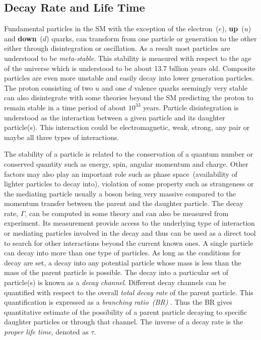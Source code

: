 \subsection{Decay Rate and Life Time}
Fundamental particles in the SM with the exception of the electron~($e$), \textbf{up}~($u$) and \textbf{down}~($d$) quarks, can transform from one particle or generation to the other either through disintegration or oscillation. As a result most particles are understood to be \textit{meta-stable}. This stability is measured with respect to the age of the universe which is understood to be about 13.7 billion years old. Composite particles are even more unstable and easily decay into lower generation particles. The proton consisting of two $u$ and one $d$ valence quarks seemingly very stable can also disintegrate with some theories beyond the SM predicting the proton to remain stable in a time period of about $10^{33}$ years.
Particle disintegration is understood as the interaction between a given particle and its daughter particle(s). This interaction could be electromagnetic, weak, strong, any pair or maybe all three types of interactions. 

The stability of a particle is related to the conservation of a quantum number or conserved quantity such as energy, spin, angular momentum and charge. Other factors may also play an important role such as phase space~(availability of lighter particles to decay into), violation of some property such as strangeness or the mediating particle usually a boson being very massive compared to the momentum transfer between the parent and the daughter particle. 
\newline
The decay rate, \textbf{$\Gamma$}, can be computed in some theory and can also be measured from experiment. Its measurement provide access to the underlying type of interaction or mediating particles involved in the decay and thus can be used as a direct tool to search for other interactions beyond the current known ones. 
A single particle can decay into more than one type of particles. As long as the conditions for decay are set, a decay into any potential particle whose mass is less than the mass of the parent particle is possible. The decay into a particular set of particle(s) is known as a \textit{decay channel}. Different decay channels can be quantified with respect to the overall \textit{total decay rate}  of the parent particle. This quantification is expressed as a \textit{ branching ratio~(BR) }. Thus the BR gives quantitative estimate of the possibility of a parent particle decaying to specific daughter particles or through that channel.
\newline
The inverse of a decay rate is the \textit{proper life time}, denoted as $\tau$.

